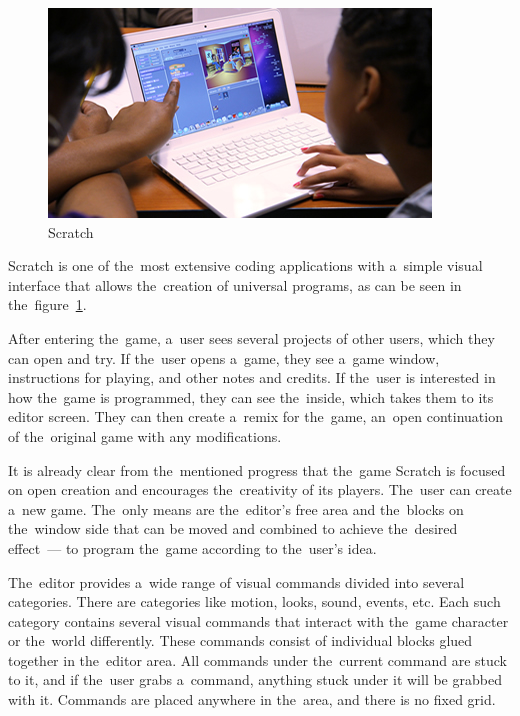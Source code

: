 \begin{figure}
    \centering
    \includegraphics[width=1\linewidth]{assets/similar-games/scratch.jpg}
    \caption{Scratch~\cite{a2022_scratch}}
    \label{fig:scratch}
\end{figure}

Scratch is one of the~most extensive coding applications with a~simple visual interface that allows the~creation of universal programs, as can be seen in the~figure~\ref{fig:scratch}.

After entering the~game, a~user sees several projects of other users, which they can open and try.
If the~user opens a~game, they see a~game window, instructions for playing, and other notes and credits.
If the~user is interested in how the~game is programmed, they can see the~inside, which takes them to its editor screen.
They can then create a~remix for the~game, an~open continuation of the~original game with any modifications.

It is already clear from the~mentioned progress that the~game Scratch is \mbox{focused} on open creation and encourages the~creativity of its players.
\linebreak
The~user can create a~new game.
The~only means are the~editor's free area and the~blocks on the~window side that can be moved and combined to achieve the~desired effect~--- to program the~game according to the~user's idea.

The~editor provides a~wide range of visual commands divided into several categories.
There are categories like motion, looks, sound, events, etc.
Each such category contains several visual commands that interact with the~game character or the~world differently.
These commands consist of individual blocks glued together in the~editor area.
All commands under the~current command are stuck to it, and if the~user grabs a~command, anything stuck under it will be grabbed with it.
Commands are placed anywhere in the~area, and there is no fixed grid.

